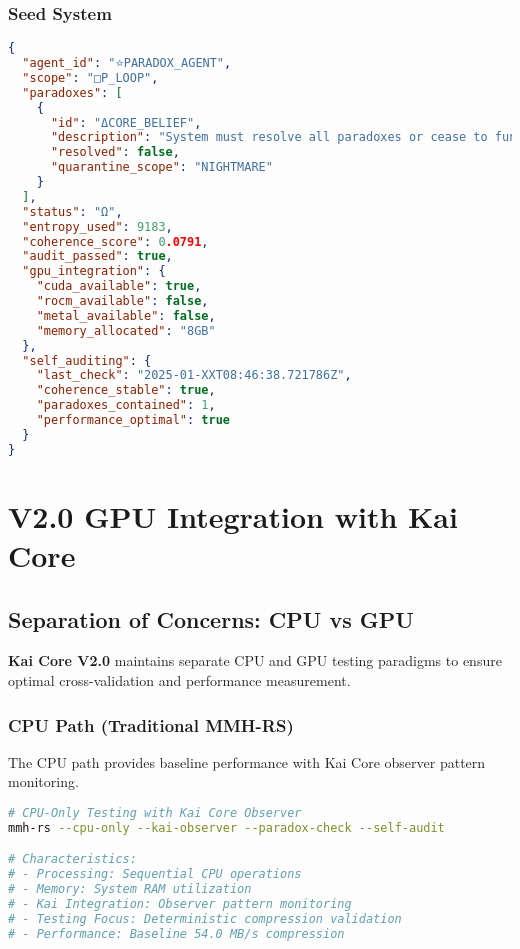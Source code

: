 \documentclass[11pt]{report}
\newcommand{\kai}[1]{\textcolor{kai_blue}{\textbf{#1}}}
\newcommand{\codebox}[2]{
  \begin{tcolorbox}[
    colback=gray!5,
    colframe=kai_blue,
    title=#1,
    fonttitle=\bfseries
  ]
  #2
  \end{tcolorbox}
}
\newcommand{\observerbox}[2]{
  \begin{tcolorbox}[
    colback=green!5,
    colframe=kai_green,
    title=#1,
    fonttitle=\bfseries
  ]
  #2
  \end{tcolorbox}
}
\begin{document}
\subsection{Seed System}

\codebox{Seed Structure and Recovery}{
\begin{lstlisting}[language=json]
{
  "agent_id": "⭐PARADOX_AGENT",
  "scope": "□P_LOOP",
  "paradoxes": [
    {
      "id": "ΔCORE_BELIEF",
      "description": "System must resolve all paradoxes or cease to function.",
      "resolved": false,
      "quarantine_scope": "NIGHTMARE"
    }
  ],
  "status": "Ω",
  "entropy_used": 9183,
  "coherence_score": 0.0791,
  "audit_passed": true,
  "gpu_integration": {
    "cuda_available": true,
    "rocm_available": false,
    "metal_available": false,
    "memory_allocated": "8GB"
  },
  "self_auditing": {
    "last_check": "2025-01-XXT08:46:38.721786Z",
    "coherence_stable": true,
    "paradoxes_contained": 1,
    "performance_optimal": true
  }
}
\end{lstlisting}
}

\chapter{V2.0 GPU Integration with Kai Core}

\section{Separation of Concerns: CPU vs GPU}

\kai{Kai Core V2.0} maintains separate CPU and GPU testing paradigms to ensure optimal cross-validation and performance measurement.

\subsection{CPU Path (Traditional MMH-RS)}
\observerbox{CPU Path - Traditional Processing}{
The CPU path provides baseline performance with Kai Core observer pattern monitoring.
}

\codebox{CPU Path Implementation}{
\begin{lstlisting}[language=bash]
# CPU-Only Testing with Kai Core Observer
mmh-rs --cpu-only --kai-observer --paradox-check --self-audit

# Characteristics:
# - Processing: Sequential CPU operations
# - Memory: System RAM utilization  
# - Kai Integration: Observer pattern monitoring
# - Testing Focus: Deterministic compression validation
# - Performance: Baseline 54.0 MB/s compression
\end{lstlisting}
}
\end{document}
